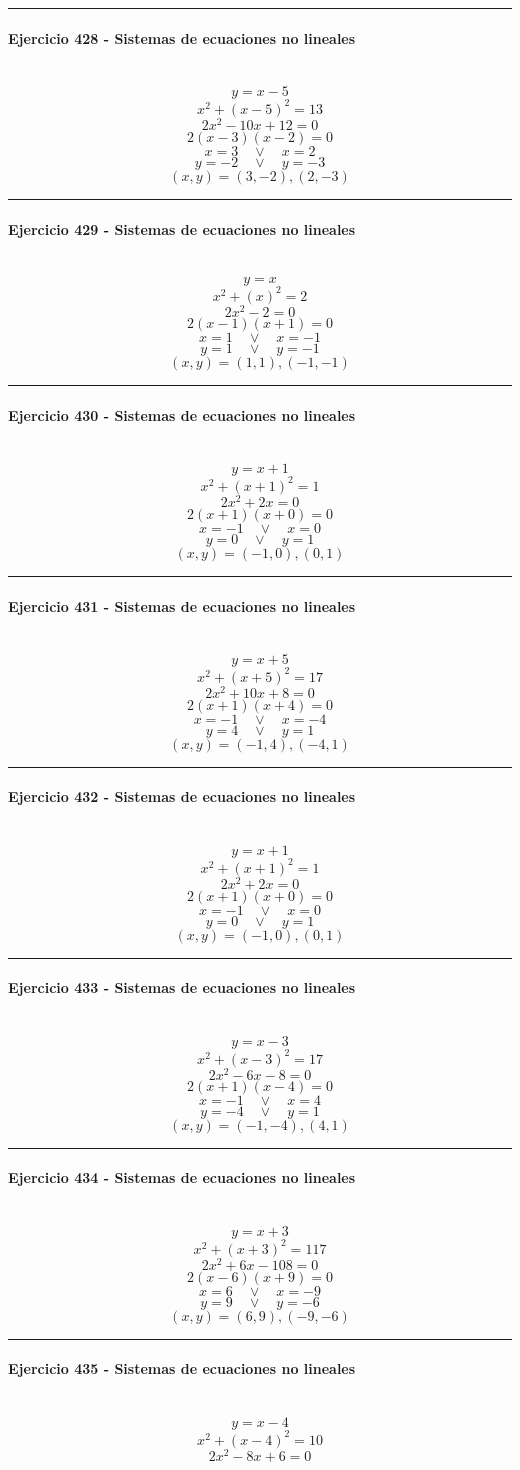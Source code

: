 \documentclass[10pt,a4paper]{article}
\newcommand{\res}[1]{\paragraph{#1}\mbox{}\\[-1.2em]}
\begin{document}
\vspace{1mm}\hrule\vspace{2mm}
\res{Ejercicio 428 - Sistemas de ecuaciones no lineales}
\[ y=x-5 \]
\[ x^2+(x-5)^2=13 \]
\[ 2 x^{2} - 10 x + 12=0 \]
\[ 2(x-3)(x-2)=0 \]
\[ x=3\quad \vee \quad x=2 \]
\[ y=-2\quad \vee \quad y=-3 \]
\[ \boxed{(x,y)=(3,-2),(2,-3)} \]
\vspace{1mm}\hrule\vspace{2mm}
\res{Ejercicio 429 - Sistemas de ecuaciones no lineales}
\[ y=x \]
\[ x^2+(x)^2=2 \]
\[ 2 x^{2} - 2=0 \]
\[ 2(x-1)(x+1)=0 \]
\[ x=1\quad \vee \quad x=-1 \]
\[ y=1\quad \vee \quad y=-1 \]
\[ \boxed{(x,y)=(1,1),(-1,-1)} \]
\vspace{1mm}\hrule\vspace{2mm}
\res{Ejercicio 430 - Sistemas de ecuaciones no lineales}
\[ y=x+1 \]
\[ x^2+(x+1)^2=1 \]
\[ 2 x^{2} + 2 x=0 \]
\[ 2(x+1)(x+0)=0 \]
\[ x=-1\quad \vee \quad x=0 \]
\[ y=0\quad \vee \quad y=1 \]
\[ \boxed{(x,y)=(-1,0),(0,1)} \]
\vspace{1mm}\hrule\vspace{2mm}
\res{Ejercicio 431 - Sistemas de ecuaciones no lineales}
\[ y=x+5 \]
\[ x^2+(x+5)^2=17 \]
\[ 2 x^{2} + 10 x + 8=0 \]
\[ 2(x+1)(x+4)=0 \]
\[ x=-1\quad \vee \quad x=-4 \]
\[ y=4\quad \vee \quad y=1 \]
\[ \boxed{(x,y)=(-1,4),(-4,1)} \]
\vspace{1mm}\hrule\vspace{2mm}
\res{Ejercicio 432 - Sistemas de ecuaciones no lineales}
\[ y=x+1 \]
\[ x^2+(x+1)^2=1 \]
\[ 2 x^{2} + 2 x=0 \]
\[ 2(x+1)(x+0)=0 \]
\[ x=-1\quad \vee \quad x=0 \]
\[ y=0\quad \vee \quad y=1 \]
\[ \boxed{(x,y)=(-1,0),(0,1)} \]
\vspace{1mm}\hrule\vspace{2mm}
\res{Ejercicio 433 - Sistemas de ecuaciones no lineales}
\[ y=x-3 \]
\[ x^2+(x-3)^2=17 \]
\[ 2 x^{2} - 6 x - 8=0 \]
\[ 2(x+1)(x-4)=0 \]
\[ x=-1\quad \vee \quad x=4 \]
\[ y=-4\quad \vee \quad y=1 \]
\[ \boxed{(x,y)=(-1,-4),(4,1)} \]
\vspace{1mm}\hrule\vspace{2mm}
\res{Ejercicio 434 - Sistemas de ecuaciones no lineales}
\[ y=x+3 \]
\[ x^2+(x+3)^2=117 \]
\[ 2 x^{2} + 6 x - 108=0 \]
\[ 2(x-6)(x+9)=0 \]
\[ x=6\quad \vee \quad x=-9 \]
\[ y=9\quad \vee \quad y=-6 \]
\[ \boxed{(x,y)=(6,9),(-9,-6)} \]
\vspace{1mm}\hrule\vspace{2mm}
\res{Ejercicio 435 - Sistemas de ecuaciones no lineales}
\[ y=x-4 \]
\[ x^2+(x-4)^2=10 \]
\[ 2 x^{2} - 8 x + 6=0 \]
\end{document}
